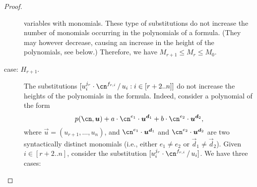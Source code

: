 \begin{proof}
\begin{claimproof}
\begin{description}
        variables with monomials. These type of substitutions do not increase
        the number of monomials occurring in the polynomials of a formula. (They
        may however decrease, causing an increase in the height of the
        polynomials, see below.) Therefore, we have $M_{r+1} \leq M_r \leq M_0$.
      \item[case: $H_{r+1}$.] 
        The substitutions $\sub{u_i^{j_r} \cdot \cn^{f_{r,i}}}{u_i : i \in
        [r+2..n]}$ do not increase the heights of the polynomials in the
        formula. Indeed, consider a polynomial of the form 
        \begin{equation}
          \label{eq:a-polynomial}
          p(\cn,\vec u) + a \cdot \cn^{e_1} \cdot \vec u^{\vec d_1} 
          + b \cdot \cn^{e_2} \cdot \vec u^{\vec d_2},
        \end{equation}
        where $\vec u = (u_{r+1},\dots,u_{n})$, and $\cn^{e_1} \cdot
        \vec{u}^{\vec{d}_1}$ and $\cn^{e_2} \cdot \vec{u}^{\vec{d}_2}$ are two
        syntactically distinct monomials (i.e., either $e_1 \neq e_2$ or
        $\vec{d}_1 \neq \vec d_2$). Given $i \in [r+2..n]$, consider the
        substitution $\sub{u_i^{j_r} \cdot \cn^{f_{r,i}}}{u_i}$. We have three
        cases: 
\end{description}
\end{claimproof}
\end{proof}
